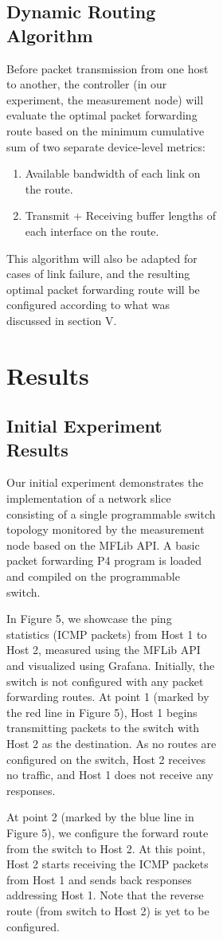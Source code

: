 \documentclass[conference]{IEEEtran}
\begin{document}
\begin{figure}[h!]
\begin{figure}[b]
\begin{figure}[t]
    \subsection{Dynamic Routing Algorithm}
      Before packet transmission from one host to another, the controller (in our experiment, the measurement node) will evaluate the optimal packet forwarding route based on the minimum cumulative sum of two separate device-level metrics:
      \begin{enumerate}
          \item Available bandwidth of each link on the route.
          \item Transmit + Receiving buffer lengths of each interface on the route.
      \end{enumerate}
      This algorithm will also be adapted for cases of link failure, and the resulting optimal packet forwarding route will be configured according to what was discussed in section V.

    \section{Results}
    \subsection{Initial Experiment Results}
    Our initial experiment demonstrates the implementation of a network slice consisting of a single programmable switch topology monitored by the measurement node based on the MFLib API.  A basic packet forwarding P4 program is loaded and compiled on the programmable switch.

    In Figure 5, we showcase the ping statistics (ICMP packets) from Host 1 to Host 2, measured using the MFLib API and visualized using Grafana.
    Initially, the switch is not configured with any packet forwarding routes. At point 1 (marked by the red line in Figure 5), Host 1 begins transmitting packets to the switch with Host 2 as the destination. As no routes are configured on the switch, Host 2 receives no traffic, and Host 1 does not receive any responses.

    At point 2 (marked by the blue line in Figure 5), we configure the forward route from the switch to Host 2. At this point, Host 2 starts receiving the ICMP packets from Host 1 and sends back responses addressing Host 1. Note that the reverse route (from switch to Host 2) is yet to be configured.


\end{figure}
\end{figure}
\end{figure}
\end{document}
